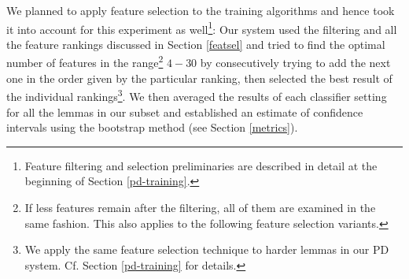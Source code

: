 \documentclass[12pt,notitlepage,a4paper]{report}
\begin{document}
We planned to apply feature selection to the training algorithms and hence took it into account for this experiment as well\footnote{Feature filtering and selection preliminaries are described in detail at the beginning of Section \ref{pd-training}.}: Our system used the filtering and all the feature rankings discussed in Section \ref{featsel} and tried to find the optimal number of features in the range\footnote{If less features remain after the filtering, all of them are examined in the same fashion. This also applies to the following feature selection variants.} $4-30$ by consecutively trying to add the next one in the order given by the particular ranking, then selected the best result of the individual rankings\footnote{We apply the same feature selection technique to harder lemmas in our PD system. Cf. Section \ref{pd-training} for details.}. We then averaged the results of each classifier setting for all the lemmas in our subset and established an estimate of confidence intervals using the bootstrap method (see Section \ref{metrics}).
\end{document}

